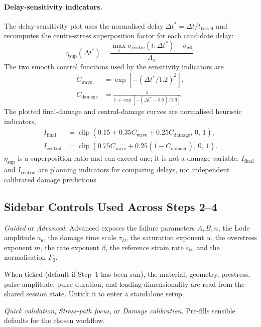 \documentclass[11pt,a4paper]{article}
\newcommand{\sig}{\sigma}
\newcommand{\eps}{\varepsilon}
\newcommand{\epsdot}{\dot\eps}
\begin{document}
\paragraph{Delay-sensitivity indicators.}
The delay-sensitivity plot uses the normalised delay
$\Delta t^\ast=\Delta t/t_{\text{travel}}$ and recomputes the centre-stress
superposition factor for each candidate delay:
\begin{equation}
  \eta_{\text{sup}}(\Delta t^\ast) =
    \frac{\max_t \sig_{\text{centre}}(t;\Delta t^\ast)-\sig_{x0}}{A_x}.
\end{equation}
The two smooth control functions used by the sensitivity indicators are
\begin{align}
  C_{\text{wave}} &= \exp\!\left[-(\Delta t^\ast/1.2)^2\right], \\
  C_{\text{damage}} &=
    \frac{1}{1+\exp\!\left[-(\Delta t^\ast-5.0)/1.3\right]}.
\end{align}
The plotted final-damage and central-damage curves are normalised heuristic
indicators,
\begin{align}
  I_{\text{final}} &=
    \operatorname{clip}\!\left(0.15 + 0.35C_{\text{wave}}
    + 0.25C_{\text{damage}},\,0,\,1\right), \\
  I_{\text{central}} &=
    \operatorname{clip}\!\left(0.75C_{\text{wave}}
    + 0.25(1-C_{\text{damage}}),\,0,\,1\right).
\end{align}
$\eta_{\text{sup}}$ is a superposition ratio and can exceed one; it is not a
damage variable. $I_{\text{final}}$ and $I_{\text{central}}$ are planning
indicators for comparing delays, not independent calibrated damage predictions.

\subsection{Sidebar Controls Used Across Steps 2--4}

\begin{description}[leftmargin=2em, style=nextline]
  \item[Control level] \emph{Guided} or \emph{Advanced}. Advanced exposes the
    failure parameters $A, B, n$, the Lode amplitude $a_\theta$, the damage
    time scale $\tau_D$, the saturation exponent $\alpha$, the overstress
    exponent $m$, the rate exponent $\beta$, the reference strain rate
    $\epsdot_0$, and the normalisation $F_0$.

  \item[Use Step 1 setup] When ticked (default if Step~1 has been run), the
    material, geometry, prestress, pulse amplitude, pulse duration, and
    loading dimensionality are read from the shared session state. Untick it
    to enter a standalone setup.

  \item[Analysis goal] \emph{Quick validation}, \emph{Stress-path focus}, or
    \emph{Damage calibration}. Pre-fills sensible defaults for the chosen
    workflow.
\end{description}
\end{document}
